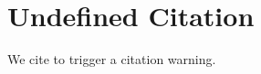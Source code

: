 \documentclass{article}
\begin{document}
\section{Undefined Citation}
We cite \cite{missing2024} to trigger a citation warning.


\end{document}
